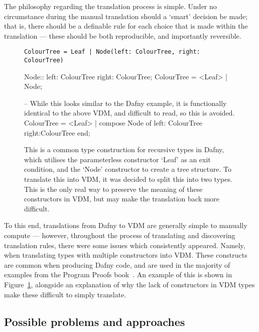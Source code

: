 \documentclass{entcs}
\begin{document}
The philosophy regarding the translation process is simple. Under no circumstance during the manual translation should a `smart' decision be made; that is, there should be a definable rule for each choice that is made within the translation --- these should be both reproducible, and importantly reversible.

\begin{figure}[h]
	\begin{center}
        \begin{lstlisting}
ColourTree = Leaf | Node(left: ColourTree, right: ColourTree)
        \end{lstlisting}
        \begin{vdmsl}
Node:: 
    left: ColourTree
    right: ColourTree;
ColourTree = <Leaf> | Node;

-- While this looks similar to the Dafny example, it is functionally identical to the above VDM, and difficult to read, so this is avoided.
ColourTree = <Leaf> | compose Node of left: ColourTree right:ColourTree end;
        \end{vdmsl}
		\caption{This is a common type construction for recursive types in Dafny, which utilises the parameterless constructor `Leaf' as an exit condition, and the `Node' constructor to create a tree structure. To translate this into VDM, it was decided to split this into two types. This is the only real way to preserve the meaning of these constructors in VDM, but may make the translation back more difficult.}\label{fig:common_dafny_types}
	\end{center}
\end{figure}

To this end, translations from Dafny to VDM are generally simple to manually compute --- however, throughout the process of translating and discovering translation rules, there were some issues which consistently appeared. Namely, when translating types with multiple constructors into VDM. These constructs are common when producing Dafny code, and are used in the majority of examples from the Program Proofs book~\cite{ProgramProofs}. An example of this is shown in Figure~\ref{fig:common_dafny_types}, alongside an explanation of why the lack of constructors in VDM types make these difficult to simply translate.

\subsection{Possible problems and approaches}\label{section:problems}
\end{document}
